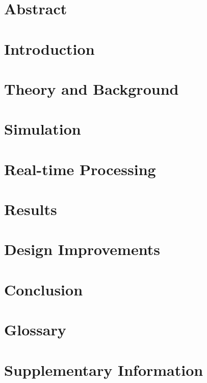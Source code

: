 \documentclass[a4paper, english, twoside, 12pt]{article}
\begin{document}
%

\thispagestyle{empty}

\pagebreak
\restoregeometry
{}

\listoftodos

\pagebreak

\glsunsetall
\tableofcontents
\pagebreak
\listoffigures
\glsresetall
\pagebreak

\section{Abstract}

\pagebreak
\section{Introduction}

\pagebreak
\section{Theory and Background}

\pagebreak
\section{Simulation}

\pagebreak
\section{Real-time Processing}

\pagebreak
\section{Results}

\pagebreak
\section{Design Improvements}

\pagebreak
%
\section{Conclusion}

\pagebreak


\pagebreak
\begin{appendices} 
	\section{Glossary}
	\printglossaries
	\pagebreak
	\section{Supplementary Information}
	
\end{appendices}
\end{document}
